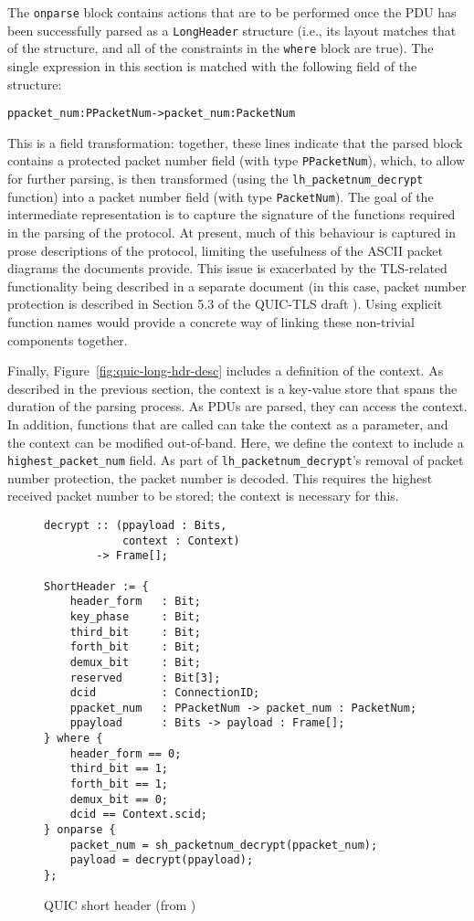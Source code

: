 \documentclass[10pt,sigconf]{acmart}
\begin{document}
The \texttt{onparse} block contains actions that are to be performed once the PDU has been
successfully parsed as a \texttt{LongHeader} structure (i.e., its layout matches that of
the structure, and all of the constraints in the \texttt{where} block are true). The
single expression in this section is matched with the following field of the structure:
\footnotesize
\begin{alltt}
    ppacket_num : PPacketNum -> packet_num : PacketNum
\end{alltt}
\normalsize
This is a field transformation: together, these lines indicate that the parsed block
contains a protected packet number field (with type \texttt{PPacketNum}), which, to allow
for further parsing, is then transformed (using the \texttt{lh\_packetnum\_decrypt} function)
into a packet number field (with type \texttt{PacketNum}). The goal of the intermediate
representation is to capture the signature of the functions required in the parsing of the
protocol. At present, much of this behaviour is captured in prose descriptions of the
protocol, limiting the usefulness of the ASCII packet diagrams the documents provide.
This issue is exacerbated by the TLS-related functionality being described in a separate
document (in this case, packet number protection is described in Section 5.3 of the
QUIC-TLS draft \cite{draft-ietf-quic-tls-14}). Using explicit function names would provide
a concrete way of linking these non-trivial components together. 

Finally, Figure~\ref{fig:quic-long-hdr-desc} includes a definition of the context. As
described in the previous section, the context is a key-value store that spans the duration
of the parsing process. As PDUs are parsed, they can access the context. In addition,
functions that are called can take the context as a parameter, and the context can be
modified out-of-band. Here, we define the context to include a \texttt{highest\_packet\_num}
field. As part of \texttt{lh\_packetnum\_decrypt}'s removal of packet number protection,
the packet number is decoded. This requires the highest received packet number to be
stored; the context is necessary for this.

\begin{figure}
	\vspace{3mm}
    \begin{BVerbatim}[fontsize=\scriptsize]
decrypt :: (ppayload : Bits, 
            context : Context) 
        -> Frame[];
                     
ShortHeader := {
	header_form   : Bit;
	key_phase     : Bit;
	third_bit     : Bit;
	forth_bit     : Bit;
	demux_bit     : Bit;
	reserved      : Bit[3];
	dcid          : ConnectionID;
	ppacket_num   : PPacketNum -> packet_num : PacketNum;
	ppayload      : Bits -> payload : Frame[];
} where {
	header_form == 0;
	third_bit == 1;
	forth_bit == 1;
	demux_bit == 0;
	dcid == Context.scid;
} onparse {
	packet_num = sh_packetnum_decrypt(ppacket_num);
	payload = decrypt(ppayload);
};
    \end{BVerbatim}
    \caption{QUIC short header (from \cite{draft-ietf-quic-transport-latest})}
    \label{fig:quic-short-hdr-desc}
\end{figure}
\end{document}
